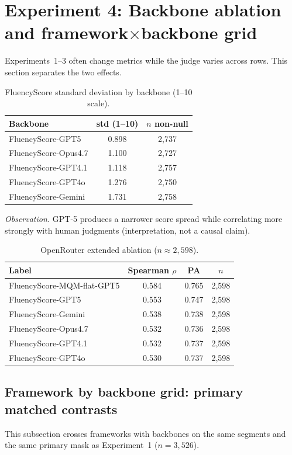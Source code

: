 \documentclass[11pt]{article}
\newcommand{\FS}{FluencyScore}
\begin{document}
\section{Experiment 4: Backbone ablation and framework$\times$backbone grid}
\label{sec:exp4}
Experiments~1--3 often change metrics while the judge varies across rows.
This section separates the two effects.

\begin{table}[t]
\centering
\scriptsize
\caption{\FS{} standard deviation by backbone (1--10 scale).}
\label{tab:4a}
\begin{tabularx}{\columnwidth}{>{\raggedright\arraybackslash}Xcc}
\toprule
Backbone & std (1--10) & $n$ non-null \\
\midrule
\FS{}-GPT5 & 0.898 & 2,737 \\
\FS{}-Opus4.7 & 1.100 & 2,727 \\
\FS{}-GPT4.1 & 1.118 & 2,757 \\
\FS{}-GPT4o & 1.276 & 2,750 \\
\FS{}-Gemini & 1.731 & 2,758 \\
\bottomrule
\end{tabularx}

\end{table}


\textit{Observation.}
GPT-5 produces a narrower score spread while correlating more strongly with
human judgments (interpretation, not a causal claim).

\begin{table}[t]
\centering
\scriptsize
\caption{OpenRouter extended ablation ($n{\approx}2{,}598$).}
\label{tab:4b}
\begin{tabularx}{\columnwidth}{>{\raggedright\arraybackslash}Xccc}
\toprule
Label & Spearman $\rho$ & PA & $n$ \\
\midrule
\FS{}-MQM-flat-GPT5 & 0.584 & 0.765 & 2,598 \\
\FS{}-GPT5 & 0.553 & 0.747 & 2,598 \\
\FS{}-Gemini & 0.538 & 0.738 & 2,598 \\
\FS{}-Opus4.7 & 0.532 & 0.736 & 2,598 \\
\FS{}-GPT4.1 & 0.532 & 0.737 & 2,598 \\
\FS{}-GPT4o & 0.530 & 0.737 & 2,598 \\
\bottomrule
\end{tabularx}

\end{table}


\subsection{Framework by backbone grid: primary matched contrasts}
\label{sec:grid}
This subsection crosses frameworks with backbones on the same segments and the
same primary mask as Experiment~1 ($n{=}3{,}526$).
\end{document}

